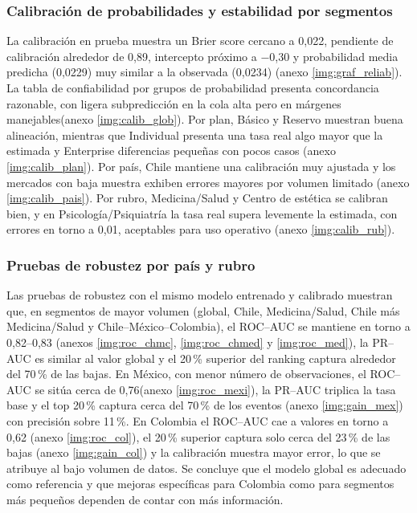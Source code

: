 \subsubsection{Calibración de probabilidades y estabilidad por segmentos}

La calibración en prueba muestra un Brier score cercano a 0{,}022, pendiente de calibración alrededor de 0{,}89, intercepto próximo a −0{,}30 y probabilidad media predicha (0{,}0229) muy similar a la observada (0{,}0234) (anexo \ref{img:graf_reliab}). La tabla de confiabilidad por grupos de probabilidad presenta concordancia razonable, con ligera subpredicción en la cola alta pero en márgenes manejables(anexo \ref{img:calib_glob}). Por plan, Básico y Reservo muestran buena alineación, mientras que Individual presenta una tasa real algo mayor que la estimada y Enterprise diferencias pequeñas con pocos casos (anexo \ref{img:calib_plan}). Por país, Chile mantiene una calibración muy ajustada y los mercados con baja muestra exhiben errores mayores por volumen limitado (anexo \ref{img:calib_pais}). Por rubro, Medicina/Salud y Centro de estética se calibran bien, y en Psicología/Psiquiatría la tasa real supera levemente la estimada, con errores en torno a 0{,}01, aceptables para uso operativo (anexo \ref{img:calib_rub}).

\subsubsection{Pruebas de robustez por país y rubro}

Las pruebas de robustez con el mismo modelo entrenado y calibrado muestran que, en segmentos de mayor volumen (global, Chile, Medicina/Salud, Chile más Medicina/Salud y Chile–México–Colombia), el ROC–AUC se mantiene en torno a 0{,}82–0{,}83 (anexos \ref{img:roc_chmc}, \ref{img:roc_chmed} y \ref{img:roc_med}), la PR–AUC es similar al valor global y el 20\,\% superior del ranking captura alrededor del 70\,\% de las bajas. En México, con menor número de observaciones, el ROC–AUC se sitúa cerca de 0{,}76(anexo \ref{img:roc_mexi}), la PR–AUC triplica la tasa base y el top 20\,\% captura cerca del 70\,\% de los eventos (anexo \ref{img:gain_mex}) con precisión sobre 11\,\%. En Colombia el ROC–AUC cae a valores en torno a 0{,}62 (anexo \ref{img:roc_col}), el 20\,\% superior captura solo cerca del 23\,\% de las bajas (anexo \ref{img:gain_col}) y la calibración muestra mayor error, lo que se atribuye al bajo volumen de datos. Se concluye que el modelo global es adecuado como referencia y que mejoras específicas para Colombia como para segmentos más pequeños dependen de contar con más información.

